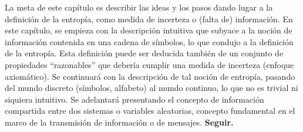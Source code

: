 {\color{red} La meta de este cap\'itulo es describir las ideas y los pasos dando
  lugar a  la definici\'on de la  entrop\'ia, como medida de  incerteza o (falta
  de)  informaci\'on.   En este  cap\'itulo,  se  empieza  con la  descripci\'on
  intuitiva que subyace  a la noci\'on de informaci\'on  contenida en una cadena
  de  s\'imbolos, lo  que  condujo a  la  definici\'on de  la entrop\'ia.   Esta
  definici\'on  puede  ser deducida  tambi\'en  de  un  conjunto de  propiedades
  ``razonables''  que  deber\'ia  cumplir   una  medida  de  incerteza  (enfoque
  axiom\'atico).   Se  continuar\'a con  la  descripci\'on  de  tal noci\'on  de
  entrop\'ia,  pasando  del  mundo  discreto  (s\'imbolos,  alfabeto)  al  mundo
  continuo,  lo  que no  es  trivial  ni  siquiera intuitivo.   Se  adelantar\'a
  presentando  el concepto  de  informaci\'on compartida  entre  dos sistemas  o
  variables aleatorias, concepto fundamental en  el marco de la transmisi\'on de
  informaci\'on o de mensajes. \bf Seguir. }
